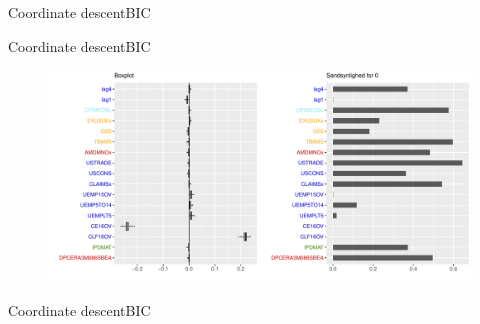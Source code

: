 \begin{frame}{Coordinate descent}{BIC}

\end{frame}

\begin{frame}{Coordinate descent}{BIC}
\begin{figure}[!htb]
        \includegraphics[width=1\linewidth, height=0.7\textheight]{slides/boxplot_lasso_coord_bic.pdf}
\end{figure}
\end{frame}

\begin{frame}{Coordinate descent}{BIC}

\end{frame}
